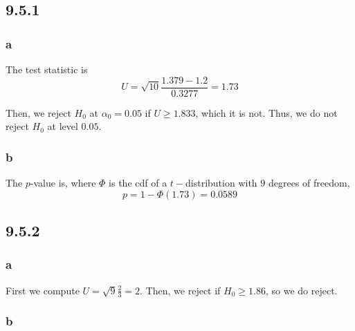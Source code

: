 \documentclass[12pt,letterpaper]{article}
\theoremstyle{definition}
\begin{document}
\subsection*{9.5.1}

\subsubsection*{a}

The test statistic is
\[
  U = \sqrt{10}\frac{1.379 - 1.2}{0.3277} = 1.73
\]

Then, we reject $H_0$ at $\alpha_0 = 0.05$ if $U \geq 1.833$, which it is not.
Thus, we do not reject $H_0$ at level $0.05$.

\subsubsection*{b}

The $p$-value is, where $\Phi$ is the cdf of a $t-$distribution with $9$ degrees
of freedom,
\[
  p = 1-\Phi(1.73) = 0.0589
\]



\subsection*{9.5.2}

\subsubsection*{a}

First we compute $U = \sqrt{9}\frac{2}{3} = 2$. Then, we reject if $H_0 \geq 1.86$,
so we do reject.

\subsubsection*{b}
\end{document}
